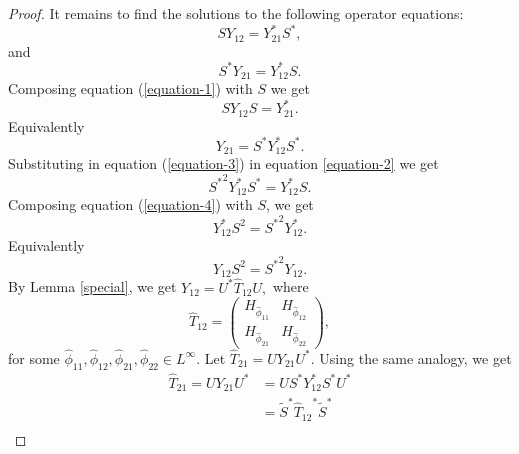 \documentclass[10pt,a4paper]{amsart}
\begin{document}
\begin{proof}
             It remains to find the solutions to the following operator equations:
             \begin{equation}\label{equation-1}
                 SY_{12}=Y^*_{21}S^*,
             \end{equation}
             and 
             \begin{equation}\label{equation-2}
                 S^*Y_{21}=Y^*_{12}S.
             \end{equation}
            Composing equation (\ref{equation-1}) with $S$ we get
            \begin{equation*}
                SY_{12}S=Y^*_{21}.
            \end{equation*}
            Equivalently
            \begin{equation}\label{equation-3}
                Y_{21}=S^*Y^*_{12}S^*.
            \end{equation}
            Substituting in equation (\ref{equation-3}) in equation \ref{equation-2} we get
            \begin{equation} \label{equation-4}
                {S^*}^2Y^*_{12}S^*=Y^*_{12}S.
            \end{equation}
            Composing equation (\ref{equation-4}) with $S$, we get
            \begin{equation*}
                 Y^*_{12}S^2={S^*}^2Y^*_{12}.
            \end{equation*}
            Equivalently
            \begin{equation*}
                 Y_{12}S^2={S^*}^2Y_{12}.
            \end{equation*}
            By Lemma \ref{special}, we get
            $Y_{12}=U^*\hat{T}_{12}U,$ where
            \begin{equation*}
            \hat{T}_{12}=
                \begin{pmatrix}
                H_{\hat{\phi}_{11}}&H_{\hat{\phi}_{12}}\\
                H_{\hat{\phi}_{21}}&H_{\hat{\phi}_{22}}
                \end{pmatrix}, 
            \end{equation*}
             for some $\hat{\phi}_{11}, \hat{\phi}_{12}, \hat{\phi}_{21}, \hat{\phi}_{22} \in L^{\infty}.$
            Let $\hat T_{21}=UY_{21}U^*.$ Using the same analogy, we get
            \begin{align*}
                \hat T_{21}=UY_{21}U^*&= U{S}^*Y^*_{12}S^*U^*\\
                &=\tilde{S}^*{\hat{T}_{12}}^*\tilde{S}^*\\

\end{align*}
\end{proof}
\end{document}
